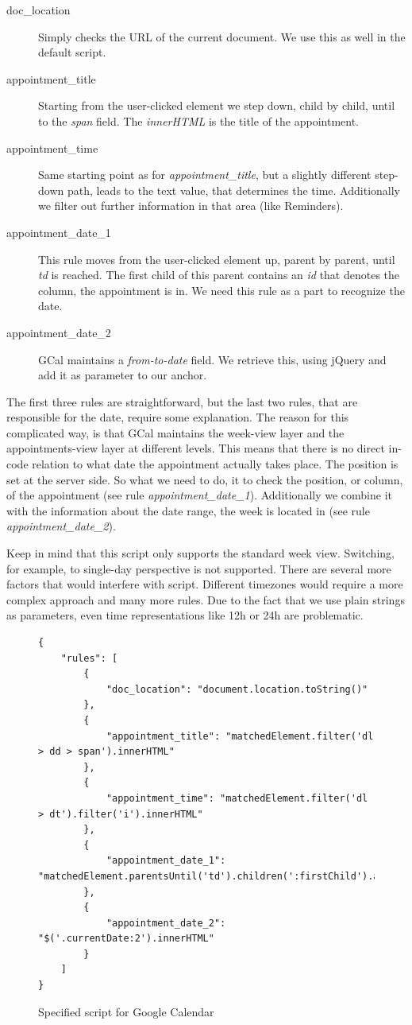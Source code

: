\begin{description}
\item[doc\_location] Simply checks the URL of the current document. We use this as well in the default script. 
\item[appointment\_title] Starting from the user-clicked element we step down, child by child, until to the \emph{span} field. The \emph{innerHTML} is the title of the appointment. 
\item[appointment\_time] Same starting point as for \emph{appointment\_title}, but a slightly different step-down path, leads to the text value, that determines the time. Additionally we filter out further information in that area (like Reminders). 
\item[appointment\_date\_1] This rule moves from the user-clicked element up, parent by parent, until \emph{td} is reached. The first child of this parent contains an \emph{id} that denotes the column, the appointment is in. We need this rule as a part to recognize the date.

\item[appointment\_date\_2] GCal maintains a \emph{from-to-date} field. We retrieve this, using jQuery and add it as parameter to our anchor. 
\end{description}

The first three rules are straightforward, but the last two rules, that are responsible for the date, require some explanation. The reason for this complicated way, is that GCal maintains the week-view layer and the appointments-view layer at different levels. This means that there is no direct in-code relation to what date the appointment actually takes place. The position is set at the server side. So what we need to do, it to check the position, or column, of the appointment (see rule \emph{appointment\_date\_1}). Additionally we combine it with the information about the date range, the week is located in (see rule \emph{appointment\_date\_2}). 

Keep in mind that this script only supports the standard week view. Switching, for example, to single-day perspective is not supported. There are several more factors that would interfere with script. Different timezones would require a more complex approach and many more rules. Due to the fact that we use plain strings as parameters, even time representations like 12h or 24h are problematic.

\begin{figure}\centering
\begin{lstlisting}
{
    "rules": [
        {
            "doc_location": "document.location.toString()"
        },
        {
            "appointment_title": "matchedElement.filter('dl > dd > span').innerHTML"
        },
        {
            "appointment_time": "matchedElement.filter('dl > dt').filter('i').innerHTML"
        },
        {
            "appointment_date_1": "matchedElement.parentsUntil('td').children(':firstChild').attr('id')"
        },
        {
            "appointment_date_2": "$('.currentDate:2').innerHTML"
        }
    ]
}
\end{lstlisting}
\caption{Specified script for Google Calendar}
\label{gcal-spec-script}
\end{figure} 

